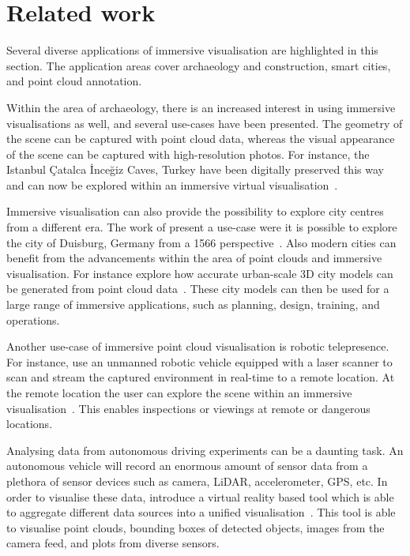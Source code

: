 \section{Related work}
Several diverse applications of immersive visualisation are highlighted in this section. The application areas cover archaeology and construction, smart cities, and point cloud annotation.

Within the area of archaeology, there is an increased interest in using immersive visualisations as well, and several use-cases have been presented. The geometry of the scene can be captured with point cloud data, whereas the visual appearance of the scene can be captured with high-resolution photos. For instance, the Istanbul \c{C}atalca \.{I}nce\u{g}iz Caves, Turkey have been digitally preserved this way and can now be explored within an immersive virtual visualisation~\cite{Buyuksalih20}.

Immersive visualisation can also provide the possibility to explore city centres from a different era. The work of \citeauthor{Tschirschwitz19} present a use-case were it is possible to explore the city of Duisburg, Germany from a 1566 perspective~\cite{Tschirschwitz19}. Also modern cities can benefit from the advancements within the area of point clouds and immersive visualisation. For instance \citeauthor{davis21} explore how accurate urban-scale 3D city models can be generated from point cloud data~\cite{davis21}. These city models can then be used for a large range of immersive applications, such as planning, design, training, and operations.

Another use-case of immersive point cloud visualisation is robotic telepresence. For instance, \citeauthor{Bruder14} use an unmanned robotic vehicle equipped with a laser scanner to scan and stream the captured environment in real-time to a remote location. At the remote location the user can explore the scene within an immersive visualisation~\cite{Bruder14}. This enables inspections or viewings at remote or dangerous locations.

Analysing data from autonomous driving experiments can be a daunting task. An autonomous vehicle will record an enormous amount of sensor data from a plethora of sensor devices such as camera, LiDAR, accelerometer, GPS, etc. In order to visualise these data, \citeauthor{Oliveira21} introduce a virtual reality based tool which is able to aggregate different data sources into a unified visualisation~\cite{Oliveira21}. This tool is able to visualise point clouds, bounding boxes of detected objects, images from the camera feed, and plots from diverse sensors.  

